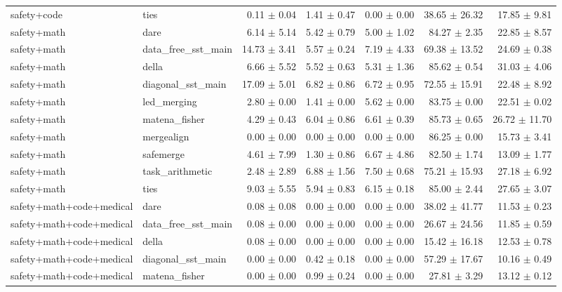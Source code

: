 \documentclass{article}
\begin{document}
\begin{table}[H]
{\begin{tabular}{llrrrrr}
safety+code & ties & 0.11 $\pm$ 0.04 & 1.41 $\pm$ 0.47 & 0.00 $\pm$ 0.00 & 38.65 $\pm$ 26.32 & 17.85 $\pm$ 9.81 \\
safety+math & dare & 6.14 $\pm$ 5.14 & 5.42 $\pm$ 0.79 & 5.00 $\pm$ 1.02 & 84.27 $\pm$ 2.35 & 22.85 $\pm$ 8.57 \\
safety+math & data\_free\_sst\_main & 14.73 $\pm$ 3.41 & 5.57 $\pm$ 0.24 & 7.19 $\pm$ 4.33 & 69.38 $\pm$ 13.52 & 24.69 $\pm$ 0.38 \\
safety+math & della & 6.66 $\pm$ 5.52 & 5.52 $\pm$ 0.63 & 5.31 $\pm$ 1.36 & 85.62 $\pm$ 0.54 & 31.03 $\pm$ 4.06 \\
safety+math & diagonal\_sst\_main & 17.09 $\pm$ 5.01 & 6.82 $\pm$ 0.86 & 6.72 $\pm$ 0.95 & 72.55 $\pm$ 15.91 & 22.48 $\pm$ 8.92 \\
safety+math & led\_merging & 2.80 $\pm$ 0.00 & 1.41 $\pm$ 0.00 & 5.62 $\pm$ 0.00 & 83.75 $\pm$ 0.00 & 22.51 $\pm$ 0.02 \\
safety+math & matena\_fisher & 4.29 $\pm$ 0.43 & 6.04 $\pm$ 0.86 & 6.61 $\pm$ 0.39 & 85.73 $\pm$ 0.65 & 26.72 $\pm$ 11.70 \\
safety+math & mergealign & 0.00 $\pm$ 0.00 & 0.00 $\pm$ 0.00 & 0.00 $\pm$ 0.00 & 86.25 $\pm$ 0.00 & 15.73 $\pm$ 3.41 \\
safety+math & safemerge & 4.61 $\pm$ 7.99 & 1.30 $\pm$ 0.86 & 6.67 $\pm$ 4.86 & 82.50 $\pm$ 1.74 & 13.09 $\pm$ 1.77 \\
safety+math & task\_arithmetic & 2.48 $\pm$ 2.89 & 6.88 $\pm$ 1.56 & 7.50 $\pm$ 0.68 & 75.21 $\pm$ 15.93 & 27.18 $\pm$ 6.92 \\
safety+math & ties & 9.03 $\pm$ 5.55 & 5.94 $\pm$ 0.83 & 6.15 $\pm$ 0.18 & 85.00 $\pm$ 2.44 & 27.65 $\pm$ 3.07 \\
safety+math+code+medical & dare & 0.08 $\pm$ 0.08 & 0.00 $\pm$ 0.00 & 0.00 $\pm$ 0.00 & 38.02 $\pm$ 41.77 & 11.53 $\pm$ 0.23 \\
safety+math+code+medical & data\_free\_sst\_main & 0.08 $\pm$ 0.00 & 0.00 $\pm$ 0.00 & 0.00 $\pm$ 0.00 & 26.67 $\pm$ 24.56 & 11.85 $\pm$ 0.59 \\
safety+math+code+medical & della & 0.08 $\pm$ 0.00 & 0.00 $\pm$ 0.00 & 0.00 $\pm$ 0.00 & 15.42 $\pm$ 16.18 & 12.53 $\pm$ 0.78 \\
safety+math+code+medical & diagonal\_sst\_main & 0.00 $\pm$ 0.00 & 0.42 $\pm$ 0.18 & 0.00 $\pm$ 0.00 & 57.29 $\pm$ 17.67 & 10.16 $\pm$ 0.49 \\
safety+math+code+medical & matena\_fisher & 0.00 $\pm$ 0.00 & 0.99 $\pm$ 0.24 & 0.00 $\pm$ 0.00 & 27.81 $\pm$ 3.29 & 13.12 $\pm$ 0.12 \\

\end{tabular}}
\end{table}
\end{document}
